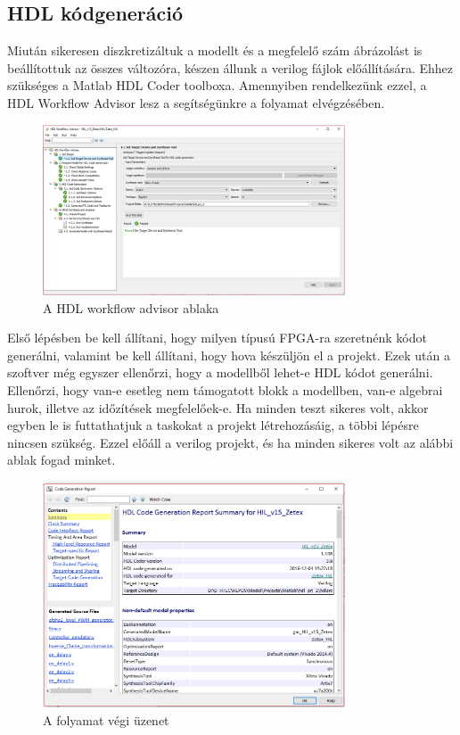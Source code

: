\subsection{HDL kódgeneráció}

Miután sikeresen diszkretizáltuk a modellt és a megfelelő szám ábrázolást is beállítottuk az összes változóra, készen állunk a verilog fájlok előállítására. Ehhez szükséges a Matlab HDL Coder toolboxa. Amennyiben rendelkezünk ezzel, a HDL Workflow Advisor lesz a segítségünkre a folyamat elvégzésében.

\begin{figure}[h!]
	\centering
	\includegraphics[width = 0.8\textwidth]{figures/hdl_advisor.png}
	\caption{A HDL workflow advisor ablaka} 
	\label{fig:hdl_advisor}
\end{figure}

Első lépésben be kell állítani, hogy milyen típusú FPGA-ra szeretnénk kódot generálni, valamint be kell állítani, hogy hova készüljön el a projekt. Ezek után a szoftver még egyszer ellenőrzi, hogy a modellből lehet-e HDL kódot generálni. Ellenőrzi, hogy van-e esetleg nem támogatott blokk a modellben, van-e algebrai hurok, illetve az időzítések megfelelőek-e. Ha minden teszt sikeres volt, akkor egyben le is futtathatjuk a taskokat a projekt létrehozásáig, a többi lépésre nincsen szükség. Ezzel előáll a verilog projekt, és ha minden sikeres volt az alábbi ablak fogad minket.

\begin{figure}[h!]
	\centering
	\includegraphics[width = 0.8\textwidth]{figures/hdl_report.png}
	\caption{A folyamat végi üzenet} 
	\label{fig:hdl_report}
\end{figure}

